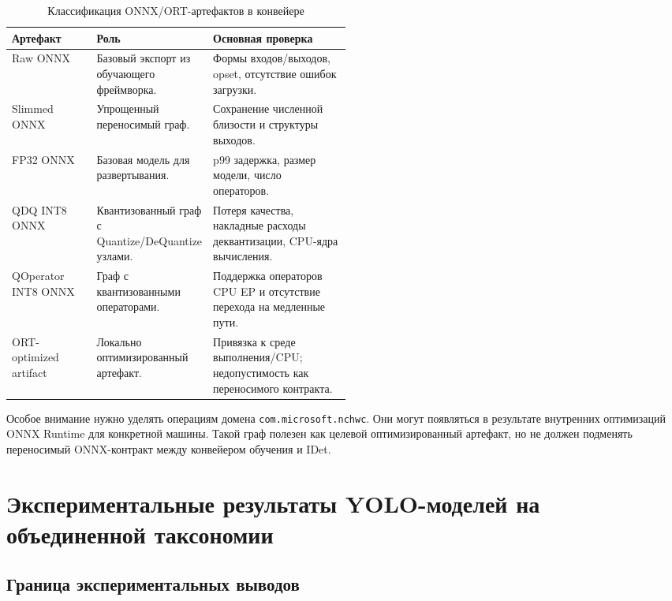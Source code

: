 \documentclass[12pt,a4paper,oneside,openany]{report}
\begin{document}
\begin{table}[H]\centering\caption{Классификация ONNX/ORT-артефактов в конвейере}\label{tab:onnx_artifact_taxonomy}\small\begin{tabularx}{\linewidth}{@{}P{0.25\linewidth}P{0.25\linewidth}Y@{}}\toprule
Артефакт & Роль & Основная проверка \\
\midrule
Raw ONNX & Базовый экспорт из обучающего фреймворка. & Формы входов/выходов, opset, отсутствие ошибок загрузки. \\
Slimmed ONNX & Упрощенный переносимый граф. & Сохранение численной близости и структуры выходов. \\
FP32 ONNX & Базовая модель для развертывания. & p99 задержка, размер модели, число операторов. \\
QDQ INT8 ONNX & Квантизованный граф с Quantize/DeQuantize узлами. & Потеря качества, накладные расходы деквантизации, CPU-ядра вычисления. \\
QOperator INT8 ONNX & Граф с квантизованными операторами. & Поддержка операторов CPU EP и отсутствие перехода на медленные пути. \\
ORT-optimized artifact & Локально оптимизированный артефакт. & Привязка к среде выполнения/CPU; недопустимость как переносимого контракта. \\
\bottomrule\end{tabularx}
\end{table}

Особое внимание нужно уделять операциям домена \texttt{com.microsoft.nchwc}. Они могут появляться в результате внутренних оптимизаций ONNX Runtime для конкретной машины. Такой граф полезен как целевой оптимизированный артефакт, но не должен подменять переносимый ONNX-контракт между конвейером обучения и IDet.


\chapter{Экспериментальные результаты YOLO-моделей на объединенной таксономии}

\section{Граница экспериментальных выводов}
\end{document}
